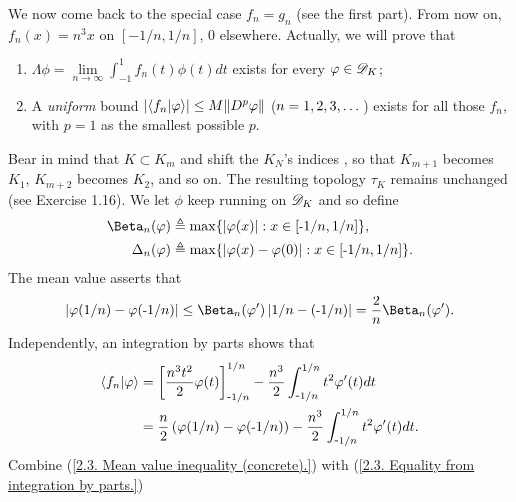 We now come back to the special case $f_n = g_n$ (see the first part). %
From now on, $f_n(x) = n^3 x$ on $[\minus 1/n, 1/n]$, $0$ elsewhere. %
Actually, we will prove that 
%
  \renewcommand{\labelenumi}{(\alph{enumi})}
  \begin{enumerate}
    \item{
        $\Lambda\phi 
          = 
        \underset{n \to \infty}{\lim} \int_{\minus 1}^1 f_{n}(t)\phi(t)dt$ 
      exists for every $\varphi\in{\mathscr D}_{K}$;
    }
    \item{
      A \textit{uniform} bound %
        $\lvert\bra{f_n}\ket{\varphi}\rvert \leq M \| D^p \varphi \|$ %
        ($n=1, 2, 3, \dots$) %
      exists for all those $f_n$, with $p=1$ as the smallest possible $p$.
    }
  \end{enumerate}
  \renewcommand{\labelenumi}{(\roman{enumi})}
%
%
Bear in mind that %
%
  $K \subset K_m$ %
%
and shift the $K_N$'s indices%
, so that %
%
  $K_{m+1}$ becomes $K_1$, $K_{m+2}$ becomes $K_2$, and so on. %
%
The resulting topology $\tau_K$ remains unchanged (see Exercise 1.16). %
%
We let $\phi$ keep running on ${\mathscr D}_K$ and so define %
%
  \begin{align}
    \Beta_{n}(\phi) 
      & 
        \Def  \max\set{\magnitude{\phi(x)}}{x \in [\minus 1/n, 1/n]}, \\
    \Delta_{n}(\phi) 
      & 
        \Def  \max\set{\magnitude{\phi(x) - \phi(0)}}{x \in [\minus 1/n, 1/n]}. 
  \end{align}
%
The mean value asserts that 
%
  \begin{align}\label{2.3. Mean value inequality (concrete).}
    \magnitude{ \phi(1/n) - \phi(\minus 1/n)} 
      \leq 
    \Beta_{n}(\phi')\magnitude{1/n - ({\minus}1/n)} 
      = 
    \frac{2}{n} \Beta_{n}(\phi').
  \end{align}
%
Independently, an integration by parts shows that %
%
  \begin{align}
    \bra{f_n}\ket{\varphi}
      & =  
        \left[ \frac{n^3 t^2}{2} \varphi(t) \right]^{1/n}_{\text{\small{-}} 1/n}
        - \frac{n^3}{2} \int_{\text{\small{-}} 1/n}^{1/n} t^{2} \varphi'(t)dt\\ 
      \label{2.3. Equality from integration by parts.}
      & =  
        \frac{n}{2}\left(\varphi(1/n) - \varphi(\text{\small{-}} 1/n)\right)
        - \frac{n^3}{2} \int_{\text{\small{-}} 1/n}^{1/n} t^{2} \varphi'(t)dt.
  \end{align}
Combine %
%
  (\ref{2.3. Mean value inequality (concrete).}) %
%
with %
  (\ref{2.3. Equality from integration by parts.})
